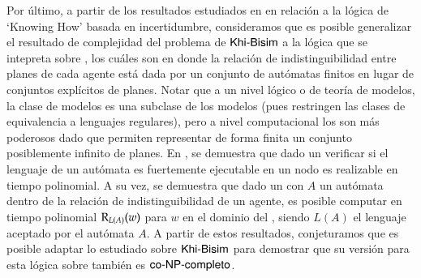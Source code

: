 Por último, a partir de los resultados estudiados en \cite{Demri_Fervari_2023} en relación a la lógica de `Knowing How' basada en incertidumbre, 
consideramos que es posible generalizar el resultado de complejidad del problema de $\rm\textsf{Khi-Bisim}$ a la lógica que se intepreta sobre \regults, los 
cuáles son \ults en donde la relación de indistinguibilidad entre planes de cada agente está dada por un conjunto de autómatas finitos en lugar 
de conjuntos explícitos de planes. 
Notar que a un nivel lógico o de teoría de modelos, la clase de modelos \regults es una subclase de los modelos \ults (pues restringen las clases de equivalencia 
a lenguajes regulares), pero a nivel computacional los \regults son más poderosos dado que permiten representar de forma finita un conjunto 
posiblemente infinito de planes. En \cite{Demri_Fervari_2023}, se demuestra que dado un \regults verificar si el lenguaje de un autómata 
es fuertemente ejecutable en un nodo es realizable en tiempo polinomial. A su vez, se demuestra que dado un \regults con $A$ un autómata dentro de la relación de indistinguibilidad de 
un agente, es posible computar en tiempo polinomial $\mathrm{R}_{L(A)}(w)$ para $w$ en el dominio del \regults, siendo $L(A)$ el lenguaje aceptado 
por el autómata $A$.
A partir de estos resultados, conjeturamos que es posible adaptar lo estudiado sobre $\rm\textsf{Khi-Bisim}$ para demostrar que su versión para 
esta lógica sobre \regults también es $\rm\textsf{co-NP-completo}$.